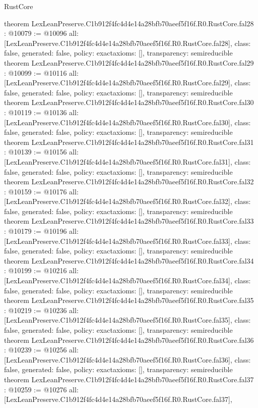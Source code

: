 \begin{lexlean}{RustCore}
\begin{coremodule}
{}
theorem LexLeanPreserve.C1b912f4fc4d4e14a28bfb70aeef5f16f.R0.RustCore.fal28 : @10079 := @10096 {
  all: [LexLeanPreserve.C1b912f4fc4d4e14a28bfb70aeef5f16f.R0.RustCore.fal28],
  class: false,
  generated: false,
  policy: exact{axioms: []},
  transparency: semireducible
}
theorem LexLeanPreserve.C1b912f4fc4d4e14a28bfb70aeef5f16f.R0.RustCore.fal29 : @10099 := @10116 {
  all: [LexLeanPreserve.C1b912f4fc4d4e14a28bfb70aeef5f16f.R0.RustCore.fal29],
  class: false,
  generated: false,
  policy: exact{axioms: []},
  transparency: semireducible
}
theorem LexLeanPreserve.C1b912f4fc4d4e14a28bfb70aeef5f16f.R0.RustCore.fal30 : @10119 := @10136 {
  all: [LexLeanPreserve.C1b912f4fc4d4e14a28bfb70aeef5f16f.R0.RustCore.fal30],
  class: false,
  generated: false,
  policy: exact{axioms: []},
  transparency: semireducible
}
theorem LexLeanPreserve.C1b912f4fc4d4e14a28bfb70aeef5f16f.R0.RustCore.fal31 : @10139 := @10156 {
  all: [LexLeanPreserve.C1b912f4fc4d4e14a28bfb70aeef5f16f.R0.RustCore.fal31],
  class: false,
  generated: false,
  policy: exact{axioms: []},
  transparency: semireducible
}
theorem LexLeanPreserve.C1b912f4fc4d4e14a28bfb70aeef5f16f.R0.RustCore.fal32 : @10159 := @10176 {
  all: [LexLeanPreserve.C1b912f4fc4d4e14a28bfb70aeef5f16f.R0.RustCore.fal32],
  class: false,
  generated: false,
  policy: exact{axioms: []},
  transparency: semireducible
}
theorem LexLeanPreserve.C1b912f4fc4d4e14a28bfb70aeef5f16f.R0.RustCore.fal33 : @10179 := @10196 {
  all: [LexLeanPreserve.C1b912f4fc4d4e14a28bfb70aeef5f16f.R0.RustCore.fal33],
  class: false,
  generated: false,
  policy: exact{axioms: []},
  transparency: semireducible
}
theorem LexLeanPreserve.C1b912f4fc4d4e14a28bfb70aeef5f16f.R0.RustCore.fal34 : @10199 := @10216 {
  all: [LexLeanPreserve.C1b912f4fc4d4e14a28bfb70aeef5f16f.R0.RustCore.fal34],
  class: false,
  generated: false,
  policy: exact{axioms: []},
  transparency: semireducible
}
theorem LexLeanPreserve.C1b912f4fc4d4e14a28bfb70aeef5f16f.R0.RustCore.fal35 : @10219 := @10236 {
  all: [LexLeanPreserve.C1b912f4fc4d4e14a28bfb70aeef5f16f.R0.RustCore.fal35],
  class: false,
  generated: false,
  policy: exact{axioms: []},
  transparency: semireducible
}
theorem LexLeanPreserve.C1b912f4fc4d4e14a28bfb70aeef5f16f.R0.RustCore.fal36 : @10239 := @10256 {
  all: [LexLeanPreserve.C1b912f4fc4d4e14a28bfb70aeef5f16f.R0.RustCore.fal36],
  class: false,
  generated: false,
  policy: exact{axioms: []},
  transparency: semireducible
}
theorem LexLeanPreserve.C1b912f4fc4d4e14a28bfb70aeef5f16f.R0.RustCore.fal37 : @10259 := @10276 {
  all: [LexLeanPreserve.C1b912f4fc4d4e14a28bfb70aeef5f16f.R0.RustCore.fal37],
}
\end{coremodule}
\end{lexlean}
